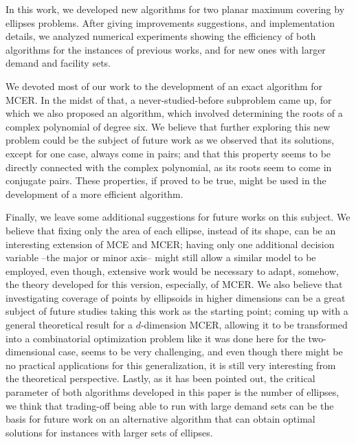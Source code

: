 In this work, we developed new algorithms for two planar maximum covering by ellipses problems.
After giving improvements suggestions, and implementation details, we analyzed numerical experiments showing the efficiency of both algorithms for the instances of previous works, and for new ones with larger demand and facility sets.

We devoted most of our work to the development of an exact algorithm for MCER.
In the midst of that, a never-studied-before subproblem came up, for which we also proposed an algorithm, which involved determining the roots of a complex polynomial of degree six.
We believe that further exploring this new problem could be the subject of future work as we observed that its solutions, except for one case, always come in pairs; and that this property seems to be directly connected with the complex polynomial, as its roots seem to come in conjugate pairs. These properties, if proved to be true, might be used in the development of a more efficient algorithm.

{\color{Green}
	Finally, we leave some additional suggestions for future works on this subject. We believe that fixing only the area of each ellipse, instead of its shape, can be an interesting extension of MCE and MCER; having only one additional decision variable --the major or minor axis-- might still allow a similar model to be employed, even though, extensive work would be necessary to adapt, somehow, the theory developed for this version, especially, of MCER.
We also believe that investigating coverage of points by ellipsoids in higher dimensions can be a great subject of future studies taking this work as the starting point; 
coming up with a general theoretical result for a $d$-dimension MCER, allowing it to be transformed into a combinatorial optimization problem like it was done here for the two-dimensional case, seems to be very challenging, and even though there might be no practical applications for this generalization, it is still very interesting from the theoretical perspective. 
{\color{Red}Lastly, as it has been pointed out, the critical parameter of both algorithms developed in this paper is the number of ellipses, we think that trading-off being able to run with large demand sets can be the basis for future work on an alternative algorithm that can obtain optimal solutions for instances with larger sets of ellipses.}
}